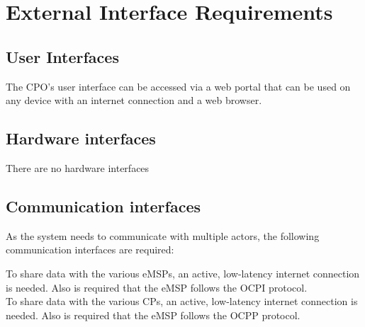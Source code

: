 \clearpage
\newpage



\section{External Interface Requirements}
\subsection{User Interfaces}
The CPO's user interface can be accessed via a web portal that can be used on any device with an internet connection and a web browser.

\subsection{Hardware interfaces}
There are no hardware interfaces

\subsection{Communication interfaces}
As the system needs to communicate with multiple actors, the following communication interfaces are required:

\begin{enumerate}
	To share data with the various eMSPs, an active, low-latency internet connection is needed. Also is required that the eMSP follows the OCPI protocol.\\
   
    To share data with the various CPs, an active, low-latency internet connection is needed. Also is required that the eMSP follows the OCPP protocol.
\end{enumerate}
